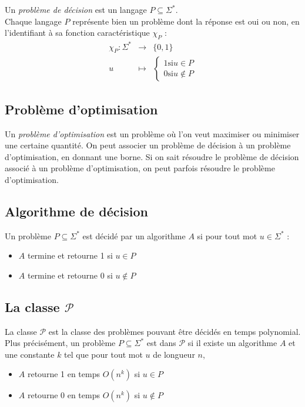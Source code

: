 \documentclass[a4paper]{article}
\begin{document}
  Un \textit{problème de décision} est un langage $P \subseteq \Sigma^*$.\\

  Chaque langage $P$ représente bien un problème dont la réponse est oui ou non, 
  en l'identifiant à sa fonction caractéristique $\chi_P$ :
  \begin{align*}
    \chi_P : \Sigma^* & \rightarrow & \{0,1\} \\
    u & \mapsto & \begin{cases}1 \text{si} u \in P \\ 0 \text{si} u \not \in P\end{cases}
  \end{align*}

  \subsection{Problème d'optimisation}
  Un \textit{problème d'optimisation} est un problème où l'on veut maximiser ou
  minimiser une certaine quantité. On peut associer un problème de décision à un
  problème d'optimisation, en donnant une borne. Si on sait résoudre le problème
  de décision associé à un problème d'optimisation, on peut parfois résoudre le
  problème d'optimisation.

  \subsection{Algorithme de décision}
  Un problème $P \subseteq \Sigma^*$ est décidé par un algorithme $A$ si pour 
  tout mot $u \in \Sigma^*$ : 
  \begin{itemize}
    \item $A$ termine et retourne 1 si $u \in P$
    \item $A$ termine et retourne 0 si $u \not \in P$
  \end{itemize}

  \subsection{La classe $\mathcal{P}$}
  La classe $\mathcal{P}$ est la classe des problèmes pouvant être décidés en temps
  polynomial. Plus précisément, un problème $P \subseteq \Sigma^*$ est dans $\mathcal{P}$
  si il existe un algorithme $A$ et une constante $k$ tel que pour tout mot $u$
  de longueur $n$, 
  \begin{itemize}
    \item $A$ retourne 1 en temps $O(n^k)$ si $u \in P$
    \item $A$ retourne 0 en temps $O(n^k)$ si $u \not \in P$
  \end{itemize}
\end{document}

